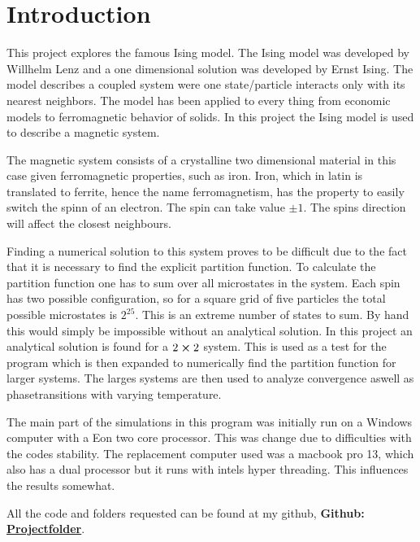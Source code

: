 \section{Introduction}
This project explores the famous Ising model. The Ising model was developed by Willhelm Lenz and a one dimensional solution was developed by Ernst Ising. The model describes a coupled system were one state/particle interacts only with its nearest neighbors. The model has been applied to every thing from economic models\cite{Zhou2007} to ferromagnetic behavior of solids\cite{onsager}. In this project the Ising model is used to describe a magnetic system. 

The magnetic system consists of a crystalline two dimensional material in this case given ferromagnetic properties, such as iron. Iron, which in latin is translated to ferrite, hence the name ferromagnetism, has the property to easily switch the spinn of an electron. The spin can take value $\pm1$. The spins direction will affect the closest neighbours.

Finding a numerical solution to this system proves to be difficult due to the fact that it is necessary to find the explicit partition function. To calculate the partition function one has to sum over all microstates in the system. Each spin has two possible configuration, so for a square grid of five particles the total possible microstates is $2^25$. This is an extreme number of states to sum. By hand this would simply be impossible without an analytical solution. In this project an analytical solution is found for a $2\cross2$ system. This is used as a test for the program which is then expanded to numerically find the partition function for larger systems. The larges systems are then used to analyze convergence aswell as phasetransitions with varying temperature.

The main part of the simulations in this program was initially run on a Windows computer with a Eon two core processor. This was change due to difficulties with the codes stability. The replacement computer used was a macbook pro 13, which also has a dual processor but it runs with intels hyper threading. This influences the results somewhat. 

All the code and folders requested can be found at my github, \textbf{Github: \href{https://github.com/thoast/Project_4}{Projectfolder}}.